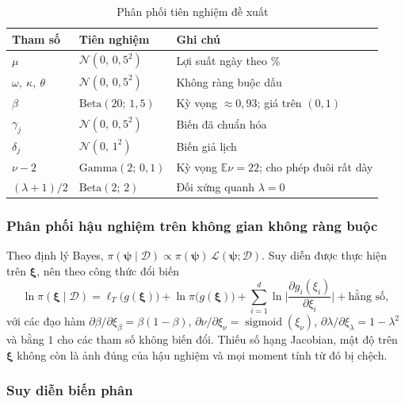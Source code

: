 \documentclass[12pt,a4paper]{article}
\theoremstyle{definition}
\theoremstyle{remark}
\newcommand{\E}{\mathbb{E}}
\newcommand{\bpsi}{\boldsymbol{\psi}}
\newcommand{\bxi}{\boldsymbol{\xi}}
\begin{document}
\begin{table}[h]
\centering
\caption{Phân phối tiên nghiệm đề xuất}\label{tab:prior}
\begin{tabular}{@{}lll@{}}
\toprule
\textbf{Tham số} & \textbf{Tiên nghiệm} & \textbf{Ghi chú} \\
\midrule
$\mu$ & $\mathcal N(0,\,0{,}5^2)$ & Lợi suất ngày theo \% \\
$\omega,\ \kappa,\ \theta$ & $\mathcal N(0,\,0{,}5^2)$ & Không ràng buộc dấu \\
$\beta$ & $\mathrm{Beta}(20;\,1{,}5)$ & Kỳ vọng $\approx 0{,}93$; giá trên $(0,1)$ \\
$\gamma_j$ & $\mathcal N(0,\,0{,}5^2)$ & Biến đã chuẩn hóa \\
$\delta_j$ & $\mathcal N(0,\,1^2)$ & Biến giả lịch \\
$\nu-2$ & $\mathrm{Gamma}(2;\,0{,}1)$ & Kỳ vọng $\E\nu=22$; cho phép đuôi rất dày \\
$(\lambda+1)/2$ & $\mathrm{Beta}(2;\,2)$ & Đối xứng quanh $\lambda=0$ \\
\bottomrule
\end{tabular}
\end{table}

\subsubsection{Phân phối hậu nghiệm trên không gian không ràng buộc}

Theo định lý Bayes, $\pi(\bpsi\mid\mathcal D)\propto\pi(\bpsi)\,\mathcal L(\bpsi;\mathcal D)$. Suy diễn được thực hiện trên $\bxi$, nên theo công thức đổi biến
\begin{equation}\label{eq:posterior}
\ln\pi(\bxi\mid\mathcal D)=\ell_T\big(g(\bxi)\big)+\ln\pi\big(g(\bxi)\big)+\sum_{i=1}^{d}\ln\Big|\frac{\partial g_i(\xi_i)}{\partial\xi_i}\Big|+\text{hằng số},
\end{equation}
với các đạo hàm $\partial\beta/\partial\xi_\beta=\beta(1-\beta)$, $\partial\nu/\partial\xi_\nu=\operatorname{sigmoid}(\xi_\nu)$, $\partial\lambda/\partial\xi_\lambda=1-\lambda^2$ và bằng $1$ cho các tham số không biến đổi. Thiếu số hạng Jacobian, mật độ trên $\bxi$ không còn là ảnh đúng của hậu nghiệm và mọi moment tính từ đó bị chệch.

\subsubsection{Suy diễn biến phân}
\end{document}
